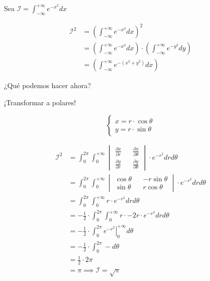 \begin{frame}[fragile]
    \begin{center}
    Sea $\mathcal{I} = \int_{- \infty}^{+ \infty}{e^{-x^2}dx}$
    \end{center}
    \begin{align*}
        \mathcal{I}^2 &= \left ( \int_{- \infty}^{+ \infty}{e^{-x^2}dx} \right )^2 \\
        &= \left ( \int_{- \infty}^{+ \infty}{e^{-x^2}dx} \right ) \cdot \left ( \int_{- \infty}^{+ \infty}{e^{-y^2}dy} \right ) \\
        &= \left ( \int_{- \infty}^{+ \infty}{e^{-(x^2 + y^2)}dx} \right )
    \end{align*}
    \begin{center}
    ¿Qué podemos hacer ahora?
    \end{center}

    \begin{center}
    ¡Transformar a polares!
    \end{center}
    $$
    \begin{cases}
        x = r \cdot \cos{\theta} \\
        y = r \cdot \sin{\theta}
    \end{cases}
    $$
\end{frame}

\begin{frame}[fragile]
    \begin{align*}
        \mathcal{I}^2 &= \int_{0}^{2 \pi}\int_0^{+ \infty} \begin{vmatrix} \frac{\partial x}{\partial r} && \frac{\partial x}{\partial \theta} \\ \frac{\partial y}{\partial r} && \frac{\partial y}{\partial \theta}\end{vmatrix} \cdot e^{-r^2} dr d\theta \\
        &= \int_{0}^{2 \pi}\int_0^{+ \infty} \begin{vmatrix} \cos \theta && -r \sin \theta \\ \sin \theta && r \cos \theta \end{vmatrix} \cdot e^{-r^2} dr d\theta \\
        &= \int_{0}^{2 \pi}\int_0^{+ \infty} r \cdot e^{-r^2} dr d\theta \\
        &= -\frac{1}{2} \cdot \int_{0}^{2 \pi}\int_0^{+ \infty} r \cdot -2r \cdot e^{-r^2} dr d\theta \\
        &= -\frac{1}{2} \cdot \int_{0}^{2 \pi} \left . e^{-r^2} \right |_{0}^{+ \infty} d\theta\\
        &= -\frac{1}{2} \cdot \int_{0}^{2 \pi} - d\theta \\
        &= \frac{1}{2} \cdot 2\pi \\
        &= \pi \implies \boxed{\mathcal{I} = \sqrt{\pi}}
    \end{align*}
\end{frame}

